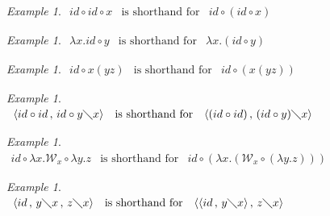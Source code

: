 \documentclass[11pt]{amsart}
\theoremstyle{plain}
\theoremstyle{definition}
\theoremstyle{remark}
\newtheorem{example}[theorem]{Example}
\numberwithin{equation}{section}
\newcommand{\ci}{\circ}
\newcommand{\mi}{\,,\,}
\newcommand{\is}{\diagdown}
\newcommand{\la}{\langle}
\newcommand{\ra}{\rangle}
\renewcommand{\pi}{\mathcal{W}}
\begin{document}
\begin{example}$\begin{array}{lll}
id\ci id\ci x & \text{is shorthand for} & id\ci (id\ci x)
\end{array}$
\end{example}
\begin{example}$\begin{array}{lll}
\lambda x.id\ci y & \text{is shorthand for} & \lambda x.(id\ci y)
\end{array}$
\end{example}
\begin{example}$\begin{array}{lll}
id\ci x(yz) & \text{is shorthand for} & id\ci (x(yz))
\end{array}$
\end{example}
\begin{example}$ $\\
$\begin{array}{lll} \la id\ci id\mi id\ci y\is x\ra & \text{is
shorthand for} & \la (id\ci id)\mi(id\ci y)\is x\ra\
\end{array}$
\end{example}
\begin{example}$ $\\
$\begin{array}{lll} id\ci\lambda x.\pi_x\ci\lambda y.z & \text{is
shorthand for} & id\ci(\lambda x.(\pi_x\ci(\lambda y.z)))
\end{array}$
\end{example}
\begin{example}$ $\\
$\begin{array}{lll} \la id\mi y\is x\mi z\is x\ra & \text{is
shorthand for} & \la\la id\mi y\is x\ra\mi z\is x\ra
\end{array}$
\end{example}
\end{document}
